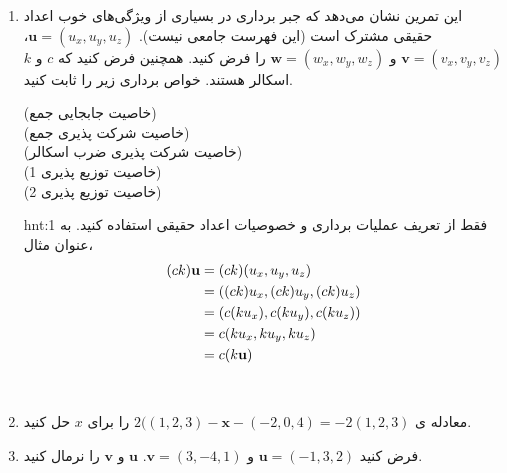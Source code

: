 {\begin{spacing}{1.5}
\begin{enumerate}[label=\textbf{\arabic*}.]
            \item {این تمرین نشان می‌دهد که جبر برداری در بسیاری از ویژگی‌های خوب اعداد حقیقی مشترک است (این فهرست جامعی نیست).
                $\textbf{u}=(u_{x},u_{y},u_{z})$، $\textbf{v}=(v_{x},v_{y},v_{z})$ و $\textbf{w}=(w_{x},w_{y},w_{z})$ را فرض کنید. همچنین فرض کنید که $c$ و $k$ اسکالر هستند. خواص برداری زیر را ثابت کنید.}
            \begin{flushleft}
            (خاصیت جابجایی جمع)
                 \\
                (خاصیت شرکت پذیری جمع)  \\
                (خاصیت شرکت پذیری ضرب اسکالر)  \\
                (خاصیت توزیع پذیری 1)  \\
                (خاصیت توزیع پذیری 2) 
            \end{flushleft}
            \begin{hint}{hnt:1}
                \Large
                فقط از تعریف عملیات برداری و خصوصیات اعداد حقیقی استفاده کنید.
                به عنوان مثال،
                \begin{equation*}
                    \centering
                    \begin{split}
                    (ck)
                        \textbf{u}&=(ck)(u_x,u_y,u_z)\\
                        &=((ck)u_x,(ck)u_y,(ck)u_z)\\
                        &=(c(ku_x),c(ku_y),c(ku_z))\\
                        &=c(ku_x,ku_y,ku_z)\\
                        &=c(k\textbf{u})
                    \end{split}
                \end{equation*}
            \end{hint} \\

            \item {معادله ی $2((1,2,3)-\textbf{x}-(-2,0,4)=-2(1,2,3)$ را برای $x$ حل کنید.}

            \item {فرض کنید $\textbf{u}=(-1,3,2)$ و $\textbf{v}=(3,-4,1)$. $\textbf{u}$ و $\textbf{v}$ را نرمال کنید.}


\end{enumerate}
\end{spacing}}
